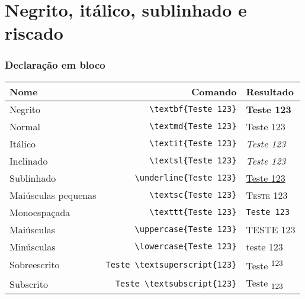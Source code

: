 \documentclass[brazilian]{beamer}
\begin{document}
\section{Negrito, itálico, sublinhado e riscado}
\begin{frame}[fragile]
    \frametitle{Declaração em bloco}
    \small
    \begin{table}[h]
        \begin{tabular}{m{2.5cm}|r|l}
            Nome                & Comando                 & Resultado                   \\ \hline
            Negrito             & \lstinline[style=myStyleLatex]!\textbf{Teste 123}!  & \textbf{Teste 123}          \\ \hline
            Normal              & \lstinline[style=myStyleLatex]!\textmd{Teste 123}!  & \textmd{Teste 123}          \\ \hline
            Itálico             & \lstinline[style=myStyleLatex]!\textit{Teste 123}!  & \textit{Teste 123}          \\ \hline
            Inclinado           & \lstinline[style=myStyleLatex]!\textsl{Teste 123}!  & \textsl{Teste 123}          \\ \hline
            Sublinhado          & \lstinline[style=myStyleLatex]!\underline{Teste 123}! & \underline{Teste 123}       \\ \hline
            Maiúsculas pequenas & \lstinline[style=myStyleLatex]!\textsc{Teste 123}! & \textsc{Teste 123}          \\ \hline
            Monoespaçada        & \lstinline[style=myStyleLatex]!\texttt{Teste 123}! & \texttt{Teste 123}          \\ \hline
            Maiúsculas          & \lstinline[style=myStyleLatex]!\uppercase{Teste 123}! & \uppercase{Teste 123}       \\ \hline
            Minúsculas          & \lstinline[style=myStyleLatex]!\lowercase{Teste 123}! & \lowercase{Teste 123}       \\ \hline
            Sobreescrito        & \lstinline[style=myStyleLatex]!Teste \textsuperscript{123}! & Teste \textsuperscript{123} \\ \hline
            Subscrito           & \lstinline[style=myStyleLatex]!Teste \textsubscript{123}! & Teste \textsubscript{123}   \\ \hline
        \end{tabular}
    \end{table}

\end{frame}
\end{document}
